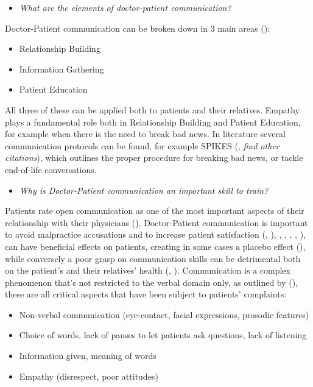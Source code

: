 

\begin{itemize}
\item \emph{What are the elements of doctor-patient communication?}
\end{itemize}{}
Doctor-Patient communication can be broken down in 3 main areas (\cite{riedl2017influence}):
\begin{itemize}
    \item Relationship Building
    \item Information Gathering
    \item Patient Education
\end{itemize}{}

All three of these can be applied both to patients and their relatives. Empathy plays a fundamental role both in Relationship Building and Patient Education, for example when there is the need to break bad news.
In literature several communication protocols can be found, for example SPIKES (\cite{baile2000spikes}, \emph{find other citations}), which outlines the proper procedure for breaking bad news, or tackle end-of-life conversations.

\begin{itemize}
\item \emph{Why is Doctor-Patient communication an important skill to train?}
\end{itemize}{}

Patients rate open communication as one of the most important aspects of their relationship with their physicians (\cite{dibbelt2010patient}).
Doctor-Patient communication is important to avoid malpractice accusations and to increase patient satisfaction (\cite{kee2018communication}, \cite{fiscella2004patient}), \cite{papadakis2005disciplinary}, \cite{stelfox2005relation}, \cite{franks2005patients}, \cite{hickson2002patient}, \cite{kohatsu2004characteristics}), can have beneficial effects on patients, creating in some cases a placebo effect (\cite{kelley2009patient}), while conversely a poor grasp on communication skills can be detrimental both on the patient's and their relatives' health (\cite{kee2018communication}, \cite{judge2004affect}).
Communication is a complex phenomenon that's not restricted to the verbal domain only, as outlined by (\cite{kee2018communication}), these are all critical aspects that have been subject to patients' complaints:
\begin{itemize}
    \item Non-verbal communication (eye-contact, facial expressions, prosodic features)
    \item Choice of words, lack of pauses to let patients ask questions, lack of listening
    \item Information given, meaning of words
    \item Empathy (disrespect, poor attitudes)
\end{itemize}{}

